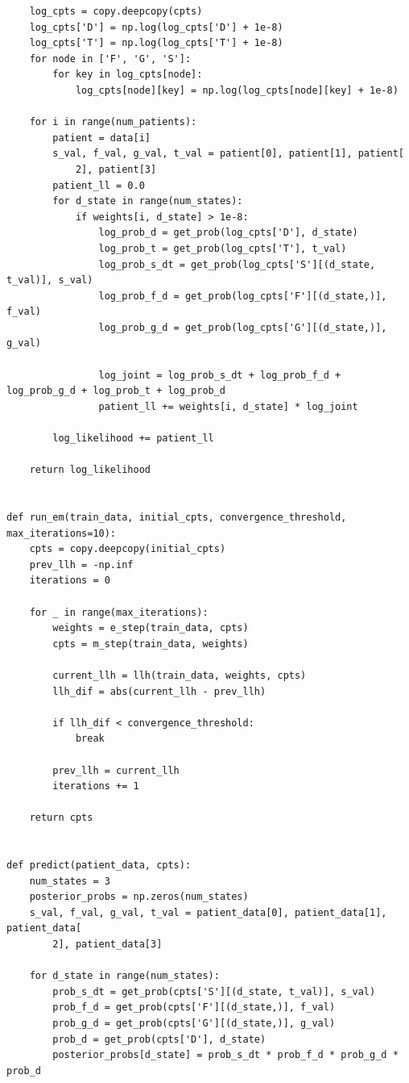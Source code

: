 \documentclass[11pt]{article}
\begin{document}
\begin{verbatim}
    log_cpts = copy.deepcopy(cpts)
    log_cpts['D'] = np.log(log_cpts['D'] + 1e-8)
    log_cpts['T'] = np.log(log_cpts['T'] + 1e-8)
    for node in ['F', 'G', 'S']:
        for key in log_cpts[node]:
            log_cpts[node][key] = np.log(log_cpts[node][key] + 1e-8)

    for i in range(num_patients):
        patient = data[i]
        s_val, f_val, g_val, t_val = patient[0], patient[1], patient[
            2], patient[3]
        patient_ll = 0.0
        for d_state in range(num_states):
            if weights[i, d_state] > 1e-8:
                log_prob_d = get_prob(log_cpts['D'], d_state)
                log_prob_t = get_prob(log_cpts['T'], t_val)
                log_prob_s_dt = get_prob(log_cpts['S'][(d_state, t_val)], s_val)
                log_prob_f_d = get_prob(log_cpts['F'][(d_state,)], f_val)
                log_prob_g_d = get_prob(log_cpts['G'][(d_state,)], g_val)

                log_joint = log_prob_s_dt + log_prob_f_d + log_prob_g_d + log_prob_t + log_prob_d
                patient_ll += weights[i, d_state] * log_joint

        log_likelihood += patient_ll

    return log_likelihood


def run_em(train_data, initial_cpts, convergence_threshold, max_iterations=10):
    cpts = copy.deepcopy(initial_cpts)
    prev_llh = -np.inf
    iterations = 0

    for _ in range(max_iterations):
        weights = e_step(train_data, cpts)
        cpts = m_step(train_data, weights)

        current_llh = llh(train_data, weights, cpts)
        llh_dif = abs(current_llh - prev_llh)

        if llh_dif < convergence_threshold:
            break

        prev_llh = current_llh
        iterations += 1

    return cpts


def predict(patient_data, cpts):
    num_states = 3
    posterior_probs = np.zeros(num_states)
    s_val, f_val, g_val, t_val = patient_data[0], patient_data[1], patient_data[
        2], patient_data[3]

    for d_state in range(num_states):
        prob_s_dt = get_prob(cpts['S'][(d_state, t_val)], s_val)
        prob_f_d = get_prob(cpts['F'][(d_state,)], f_val)
        prob_g_d = get_prob(cpts['G'][(d_state,)], g_val)
        prob_d = get_prob(cpts['D'], d_state)
        posterior_probs[d_state] = prob_s_dt * prob_f_d * prob_g_d * prob_d


\end{verbatim}
\end{document}
